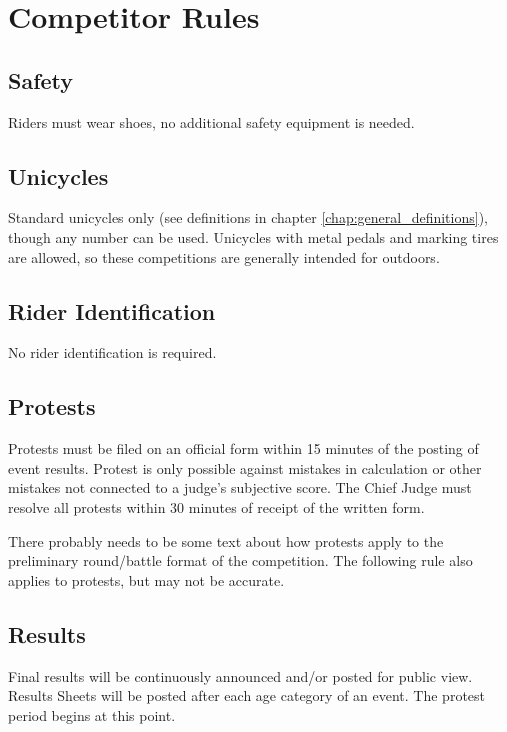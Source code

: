 \chapter{Competitor Rules}

\section{Safety}

Riders must wear shoes, no additional safety equipment is needed.

\section{Unicycles}

Standard unicycles only (see definitions in chapter \ref{chap:general_definitions}), though any number can be used.
Unicycles with metal pedals and marking tires are allowed, so these competitions are generally intended for outdoors.

\section{Rider Identification}

No rider identification is required.

\section{Protests}

Protests must be filed on an official form within 15 minutes of the posting of event results.
Protest is only possible against mistakes in calculation or other mistakes not connected to a judge's subjective score.
The Chief Judge must resolve all protests within 30 minutes of receipt of the written form.

\begin{comment-2016}
There probably needs to be some text about how protests apply to the preliminary round/battle format of the competition.  The following rule also applies to protests, but may not be accurate.
\end{comment-2016}

\section{Results}
Final results will be continuously announced and/or posted for public view.
Results Sheets will be posted after each age category of an event.
The protest period begins at this point.

